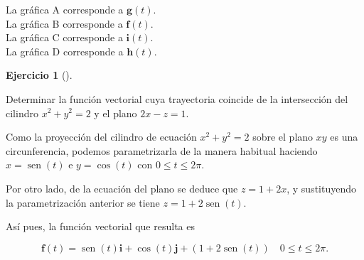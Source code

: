 \documentclass[
  a4paper,
]{scrreport}
\theoremstyle{definition}
\newtheorem{exercise}{Ejercicio}[chapter]
\theoremstyle{remark}
\begin{document}
\begin{tcolorbox}[enhanced jigsaw, toprule=.15mm, coltitle=black, colframe=quarto-callout-tip-color-frame, leftrule=.75mm, breakable, left=2mm, opacitybacktitle=0.6, colbacktitle=quarto-callout-tip-color!10!white, bottomrule=.15mm, opacityback=0, title=\textcolor{quarto-callout-tip-color}{\faLightbulb}\hspace{0.5em}{Solución}, bottomtitle=1mm, toptitle=1mm, titlerule=0mm, colback=white, arc=.35mm, rightrule=.15mm]

La gráfica A corresponde a \(\mathbf{g}(t)\).\\
La gráfica B corresponde a \(\mathbf{f}(t)\).\\
La gráfica C corresponde a \(\mathbf{i}(t)\).\\
La gráfica D corresponde a \(\mathbf{h}(t)\).

\end{tcolorbox}

\begin{exercise}[]\protect\hypertarget{exr-trayectoria-interseccion-superficies}{}\label{exr-trayectoria-interseccion-superficies}

Determinar la función vectorial cuya trayectoria coincide de la
intersección del cilindro \(x^2+y^2=2\) y el plano \(2x-z=1\).

\end{exercise}

\begin{tcolorbox}[enhanced jigsaw, toprule=.15mm, coltitle=black, colframe=quarto-callout-tip-color-frame, leftrule=.75mm, breakable, left=2mm, opacitybacktitle=0.6, colbacktitle=quarto-callout-tip-color!10!white, bottomrule=.15mm, opacityback=0, title=\textcolor{quarto-callout-tip-color}{\faLightbulb}\hspace{0.5em}{Solución}, bottomtitle=1mm, toptitle=1mm, titlerule=0mm, colback=white, arc=.35mm, rightrule=.15mm]

Como la proyección del cilindro de ecuación \(x^2+y^2=2\) sobre el plano
\(xy\) es una circunferencia, podemos parametrizarla de la manera
habitual haciendo \(x=\operatorname{sen}(t)\) e \(y=\cos(t)\) con
\(0\leq t \leq 2\pi\).

Por otro lado, de la ecuación del plano se deduce que \(z = 1+2x\), y
sustituyendo la parametrización anterior se tiene
\(z = 1+2\operatorname{sen}(t)\).

Así pues, la función vectorial que resulta es

\[
\mathbf{f}(t) = \operatorname{sen}(t)\mathbf{i} + \cos(t)\mathbf{j} + (1+2\operatorname{sen}(t)) \quad 0\leq t \leq 2\pi.
\]

\end{tcolorbox}
\end{document}
